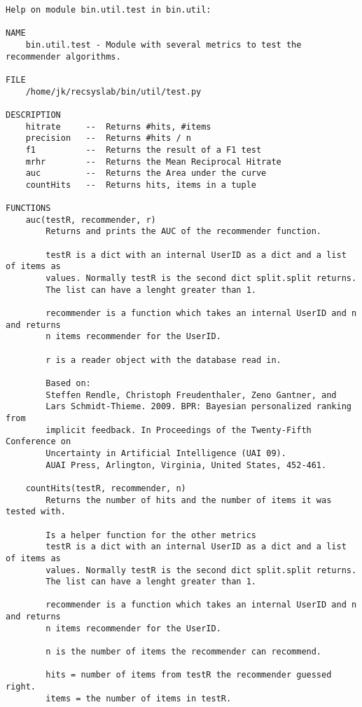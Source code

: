 \begin{lstlisting}[style=docstring]
Help on module bin.util.test in bin.util:

NAME
    bin.util.test - Module with several metrics to test the recommender algorithms.

FILE
    /home/jk/recsyslab/bin/util/test.py

DESCRIPTION
    hitrate     --  Returns #hits, #items
    precision   --  Returns #hits / n
    f1          --  Returns the result of a F1 test
    mrhr        --  Returns the Mean Reciprocal Hitrate
    auc         --  Returns the Area under the curve
    countHits   --  Returns hits, items in a tuple

FUNCTIONS
    auc(testR, recommender, r)
        Returns and prints the AUC of the recommender function.
        
        testR is a dict with an internal UserID as a dict and a list of items as
        values. Normally testR is the second dict split.split returns.
        The list can have a lenght greater than 1.
        
        recommender is a function which takes an internal UserID and n and returns
        n items recommender for the UserID.
        
        r is a reader object with the database read in.
        
        Based on:
        Steffen Rendle, Christoph Freudenthaler, Zeno Gantner, and
        Lars Schmidt-Thieme. 2009. BPR: Bayesian personalized ranking from
        implicit feedback. In Proceedings of the Twenty-Fifth Conference on
        Uncertainty in Artificial Intelligence (UAI 09).
        AUAI Press, Arlington, Virginia, United States, 452-461.
    
    countHits(testR, recommender, n)
        Returns the number of hits and the number of items it was tested with.
        
        Is a helper function for the other metrics
        testR is a dict with an internal UserID as a dict and a list of items as
        values. Normally testR is the second dict split.split returns.
        The list can have a lenght greater than 1.
        
        recommender is a function which takes an internal UserID and n and returns
        n items recommender for the UserID.
        
        n is the number of items the recommender can recommend.
        
        hits = number of items from testR the recommender guessed right.
        items = the number of items in testR.
        

\end{lstlisting}
